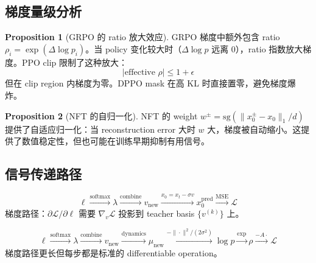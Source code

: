 \documentclass[11pt,a4paper]{article}
\newcommand{\loss}{\mathcal{L}}
\newcommand{\sg}{\mathrm{sg}}
\theoremstyle{definition}
\newtheorem{proposition}{Proposition}
\begin{document}
\subsection{梯度量级分析}

\begin{proposition}[GRPO 的 ratio 放大效应]
GRPO 梯度中额外包含 ratio $\rho_i = \exp(\Delta \log p_i)$。当 policy 变化较大时（$\Delta \log p$ 远离 0），ratio 指数放大梯度。PPO clip 限制了这种放大：
\begin{equation}
|\text{effective } \rho| \leq 1 + \epsilon
\end{equation}
但在 clip region 内梯度为零。DPPO mask 在高 KL 时直接置零，避免梯度爆炸。
\end{proposition}

\begin{proposition}[NFT 的自归一化]
NFT 的 weight $w^{\pm} = \sg(\|x_0^{\pm} - x_0\|_1/d)$ 提供了自适应归一化：当 reconstruction error 大时 $w$ 大，梯度被自动缩小。这提供了数值稳定性，但也可能在训练早期抑制有用信号。
\end{proposition}

\subsection{信号传递路径}

\begin{tcolorbox}[title=NFT: Velocity-Space Projection]
\begin{equation}
\ell \xrightarrow{\text{softmax}} \lambda \xrightarrow{\text{combine}} v_{\mathrm{new}} \xrightarrow{x_0 = x_t - \sigma v} x_0^{\mathrm{pred}} \xrightarrow{\text{MSE}} \loss
\end{equation}
梯度路径：$\partial \loss / \partial \ell$ 需要 $\nabla_v \loss$ 投影到 teacher basis $\{v^{(k)}\}$ 上。
\end{tcolorbox}

\begin{tcolorbox}[title=GRPO: Log-Probability Chain]
\begin{equation}
\ell \xrightarrow{\text{softmax}} \lambda \xrightarrow{\text{combine}} v_{\mathrm{new}} \xrightarrow{\text{dynamics}} \mu_{\mathrm{new}} \xrightarrow{-\|\cdot\|^2/(2\sigma^2)} \log p \xrightarrow{\exp} \rho \xrightarrow{-A \cdot} \loss
\end{equation}
梯度路径更长但每步都是标准的 differentiable operation。
\end{tcolorbox}

\end{document}
